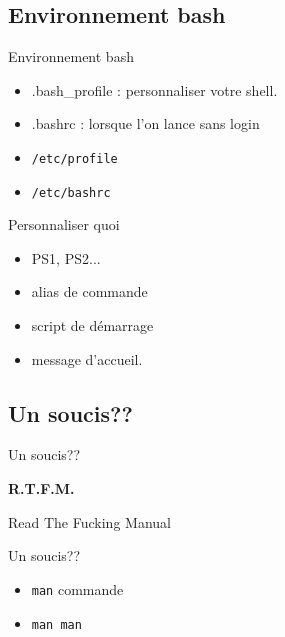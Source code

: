 \def\subsectitle{Environnement bash}
\subsection{\subsectitle}
\begin{frame}[containsverbatim]{\sectitle}
\begin{block}{\subsectitle}
\begin{itemize}
\item .bash\_profile : personnaliser votre shell.
\item .bashrc : lorsque l'on lance sans login
\item \verb!/etc/profile!
\item \verb!/etc/bashrc!
\end{itemize}


\end{block}



\def\subsectitle{Personnaliser quoi}
\begin{block}{\subsectitle}
\begin{itemize}
\item  PS1, PS2...
\item alias de commande
\item script de démarrage
\item message d'accueil.
\end{itemize}
\end{block}
\end{frame}

\def\subsectitle{Un soucis??}
\subsection{\subsectitle}
\begin{frame}[containsverbatim]{\sectitle}
\begin{block}{\subsectitle}
\begin{center}
{\bf
R.T.F.M.

Read The Fucking Manual
}
\end{center}


\end{block}
\end{frame}

\begin{frame}[containsverbatim]{\sectitle}
\begin{block}{\subsectitle}
\begin{itemize}
\item \verb!man! commande
\item \verb!man man!
\end{itemize}
\end{block}
\end{frame}


